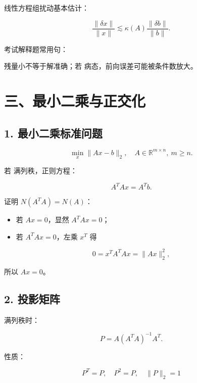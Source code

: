 \documentclass[11pt,a4paper]{ctexart}
\newcommand{\code}[1]{\begingroup\ttfamily\small #1\endgroup}
\begin{document}
线性方程组扰动基本估计：

\[
\frac{\|\delta x\|}{\|x\|}
\lesssim
\kappa(A)\frac{\|\delta b\|}{\|b\|}.
\]

考试解释题常用句：

残量小不等于解准确；若 \code{} 病态，前向误差可能被条件数放大。


\section*{三、最小二乘与正交化}



\subsection*{1. 最小二乘标准问题}


\[
\min_x \|Ax-b\|_2,\quad A\in \mathbb R^{m\times n},\ m\ge n.
\]

若 \code{} 满列秩，正则方程：

\[
A^TAx=A^Tb.
\]

证明 $N(A^TA)=N(A)$：

\begin{itemize}

\item 若 $Ax=0$，显然 $A^TAx=0$；

\item 若 $A^TAx=0$，左乘 $x^T$ 得

\end{itemize}

\[
0=x^TA^TAx=\|Ax\|_2^2,
\]

所以 $Ax=0$。


\subsection*{2. 投影矩阵}


满列秩时：

\[
P=A(A^TA)^{-1}A^T.
\]

性质：

\[
P^T=P,\quad P^2=P,\quad \|P\|_2=1
\]
\end{document}
